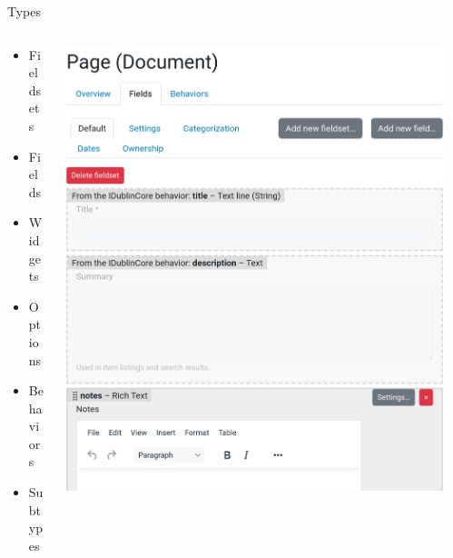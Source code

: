 \documentclass[12pt,aspectratio=169]{beamer}
\begin{document}
\begin{frame}{Types}
  \begin{columns}
    \begin{column}{0.3\textwidth}
      \begin{itemize}
        \item Fieldsets
        \item Fields
        \item Widgets
        \item Options
        \item Behaviors
        \item Subtypes
      \end{itemize}
    \end{column}
    \begin{column}{0.35\textwidth}
      \centering
      \includegraphics[width=0.95\columnwidth]{images/dexterity-01.png}
    \end{column}
    \begin{column}{0.35\textwidth}
      \centering

\end{column}
\end{columns}
\end{frame}
\end{document}
